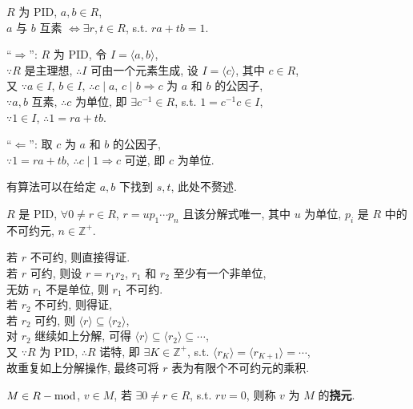 \documentclass{note}
\begin{document}
\begin{thm}[(课本定理 0.29)]
    $R$ 为 PID, $a,b\in R$,\\
    $a$ 与 $b$ 互素 $\Longleftrightarrow\exists r,t\in R$, s.t. $ra+tb=1$.
\end{thm}
\begin{pf}
    ``$\Longrightarrow$'': $R$ 为 PID, 令 $I=\langle a,b\rangle$,\\
    $\because R$ 是主理想, $\therefore I$ 可由一个元素生成, 设 $I=\langle c\rangle$, 其中 $c\in R$,\\
    又 $\because a\in I$, $b\in I$, $\therefore c\mid a$, $c\mid b\Longrightarrow c$ 为 $a$ 和 $b$ 的公因子,\\
    $\because a,b$ 互素, $\therefore c$ 为单位, 即 $\exists c^{-1}\in R$, s.t. $1=c^{-1}c\in I$,\\
    $\because 1\in I$, $\therefore 1=ra+tb$.

    ``$\Longleftarrow$'': 取 $c$ 为 $a$ 和 $b$ 的公因子,\\
    $\because 1=ra+tb$, $\therefore c\mid 1\Longrightarrow c$ 可逆, 即 $c$ 为单位.
\end{pf}

有算法可以在给定 $a,b$ 下找到 $s,t$, 此处不赘述.

\begin{thm}[(课本定理 0.29)]
    $R$ 是 PID, $\forall 0\neq r\in R$, $r=up_1\cdots p_n$ 且该分解式唯一, 其中 $u$ 为单位, $p_i$ 是 $R$ 中的不可约元, $n\in\mathbb{Z}^+$.
\end{thm}
\begin{pf}
    若 $r$ 不可约, 则直接得证.\\
    若 $r$ 可约, 则设 $r=r_1r_2$, $r_1$ 和 $r_2$ 至少有一个非单位,\\
    无妨 $r_1$ 不是单位, 则 $r_1$ 不可约.\\
    若 $r_2$ 不可约, 则得证,\\
    若 $r_2$ 可约, 则 $\langle r\rangle\subseteq\langle r_2\rangle$,\\
    对 $r_2$ 继续如上分解, 可得 $\langle r\rangle\subseteq\langle r_2\rangle\subseteq\cdots$,\\
    又 $\because R$ 为 PID, $\therefore R$ 诺特, 即 $\exists K\in\mathbb{Z}^+$, s.t. $\langle r_K\rangle=\langle r_{K+1}\rangle=\cdots$,\\
    故重复如上分解操作, 最终可将 $r$ 表为有限个不可约元的乘积.
\end{pf}

\begin{df}[挠元 (Torsion)]
    $M\in R-\operatorname{mod}$, $v\in M$, 若 $\exists 0\neq r\in R$, s.t. $rv=0$, 则称 $v$ 为 $M$ 的\textbf{挠元}.
\end{df}
\end{document}
